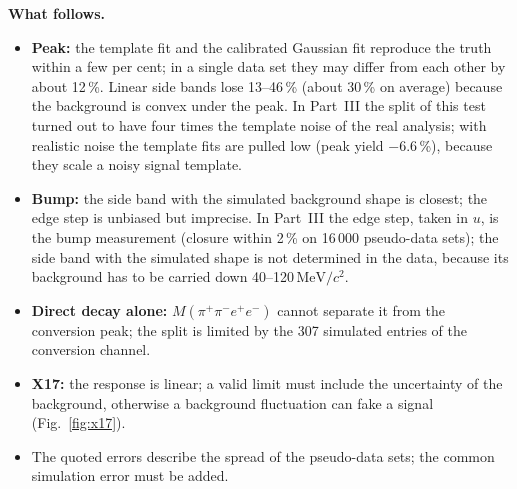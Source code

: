 \documentclass[11pt,a4paper]{article}
\newcommand{\Mfour}{\ensuremath{M(\pi^{+}\pi^{-}e^{+}e^{-})}\xspace}
\newcommand{\MeVcc}{\ensuremath{\mathrm{MeV}/c^{2}}\xspace}
\begin{document}
\textbf{What follows.}
\begin{itemize}
\item \textbf{Peak:} the template fit and the calibrated Gaussian fit reproduce the truth within a few per cent;
      in a single data set they may differ from each other by about 12\,\%. Linear side bands lose 13--46\,\% (about 30\,\%
      on average) because the background is convex under the peak. In Part~III the split of this test turned out to have four
      times the template noise of the real analysis; with realistic noise the template fits are pulled low (peak yield
      $-6.6$\,\%), because they scale a noisy signal template.
\item \textbf{Bump:} the side band with the simulated background shape is closest; the edge step is unbiased but
      imprecise. In Part~III the edge step, taken in $u$, is the bump measurement (closure within 2\,\% on 16\,000 pseudo-data
      sets); the side band with the simulated shape is not determined in the data, because its background has to be
      carried down 40--120\,\MeVcc.
\item \textbf{Direct decay alone:} \Mfour cannot separate it from the conversion peak; the split is limited by
      the 307 simulated entries of the conversion channel.
\item \textbf{X17:} the response is linear; a valid limit must include the uncertainty of the background,
      otherwise a background fluctuation can fake a signal (Fig.~\ref{fig:x17}).
\item The quoted errors describe the spread of the pseudo-data sets; the common simulation error must be added.
\end{itemize}

\end{document}
